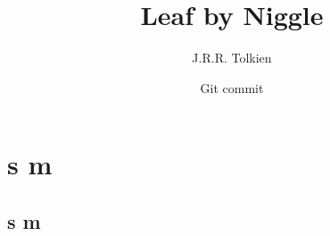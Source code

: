 \documentclass{book}
\begin{document}
\title{Leaf by Niggle}
\author{J.R.R. Tolkien}
\date{Git commit \gitFirstTagDescribe}
\maketitle

\renewenvironment{itemize}{}{}
\renewcommand{\item}{}
\RenewDocumentCommand \section {s m}{}
\RenewDocumentCommand \subsection {s m}{}


\end{document}
